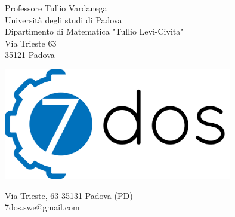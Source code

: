 \begin{letter}{Professore Tullio Vardanega \\ Università degli studi di Padova \\ Dipartimento di Matematica "Tullio Levi-Civita" \\ Via Trieste 63 \\ 35121 Padova} %

\begin{center}
\includegraphics[width=10cm]{../logo}
\end{center}

\begin{flushright}
Via Trieste, 63 35131 Padova (PD)\\
7dos.swe@gmail.com
\end{flushright}



\end{letter}
